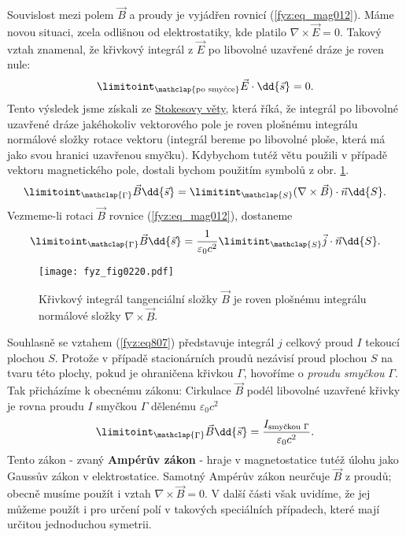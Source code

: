       Souvislost mezi polem \(\vec{B}\) a proudy je vyjádřen rovnicí (\ref{fyz:eq_mag012}). Máme 
      novou situaci, zcela odlišnou od elektrostatiky, kde platilo \(\nabla\times\vec{E}=0\). 
      Takový vztah znamenal, že křivkový integrál z \(\vec{E}\) po libovolné uzavřené dráze je 
      roven nule:
      \begin{equation}\label{fyz:eq_mag013} 
        \limitoint_{\mathclap{\substack{\text{po smyčce}}}}\vec{E}\cdot\dd{\vec{s}} = 0.
      \end{equation} 
      Tento výsledek jsme získali ze \hyperlink{fyz:IIchapIIIsecV}{Stokesovy věty}, která říká, že 
      integrál po libovolné uzavřené dráze jakéhokoliv vektorového pole je roven plošnému 
      integrálu normálové složky rotace vektoru (integrál bereme po libovolné ploše, která má jako 
      svou hranici uzavřenou smyčku). Kdybychom tutéž větu použili v případě vektoru magnetického 
      pole, dostali bychom použitím symbolů z obr. \ref{fyz:fig0220}.
      \begin{equation}\label{fyz:eq_mag014} 
        \limitoint_{\mathclap{\substack{\Gamma}}}\vec{B}\dd{\vec{s}} = 
        \limitint_{\mathclap{\substack{S}}}(\nabla\times\vec{B})\cdot\vec{n}\dd{S}.
      \end{equation}       
      Vezmeme-li rotaci \(\vec{B}\) rovnice (\ref{fyz:eq_mag012}), dostaneme
      \begin{equation}\label{fyz:eq801}
        \limitoint_{\mathclap{\substack{\Gamma}}}\vec{B}\dd{\vec{s}} = 
        \dfrac{1}{\varepsilon_0c^2}\limitint_{\mathclap{\substack{S}}}\vec{j}\cdot\vec{n}\dd{S}.
      \end{equation}
      \begin{figure}[ht!]
        \centering
        \texttt{[image: fyz\_fig0220.pdf]}
        \caption{Křivkový integrál tangenciální složky \(\vec{B}\) je roven plošnému integrálu 
                 normálové složky \(\nabla\times\vec{B}\).}
        \label{fyz:fig0220} 
      \end{figure}
      Souhlasně se vztahem (\ref{fyz:eq807}) představuje integrál \(j\) celkový proud \(I\)
      tekoucí plochou \(S\). Protože v případě stacionárních proudů nezávisí proud plochou \(S\) na
      tvaru této plochy, pokud je ohraničena křivkou \(\Gamma\), hovoříme o \emph{proudu smyčkou}
      \(\Gamma\). Tak přicházíme k obecnému zákonu: Cirkulace \(\vec{B}\) podél libovolné uzavřené
      křivky je rovna proudu \(I\) smyčkou \(\Gamma\) dělenému \(\varepsilon_0c^2\)
      \begin{equation}\label{fyz:eq802}
        \limitoint_{\mathclap{\substack{\Gamma}}}\vec{B}\dd{\vec{s}} = 
        \dfrac{I_{\text{smyčkou }\Gamma}}{\varepsilon_0c^2}.
      \end{equation}
      Tento zákon - zvaný \textbf{Ampérův zákon} - hraje v magnetostatice tutéž úlohu jako Gaussův
      zákon v elektrostatice. Samotný Ampérův zákon neurčuje \(\vec{B}\) z proudů; obecně musíme
      použít i vztah \(\nabla\times\vec{B} = 0\). V další části však uvidíme, že jej můžeme použít i
      pro určení polí v takových speciálních případech, které mají určitou jednoduchou symetrii.

